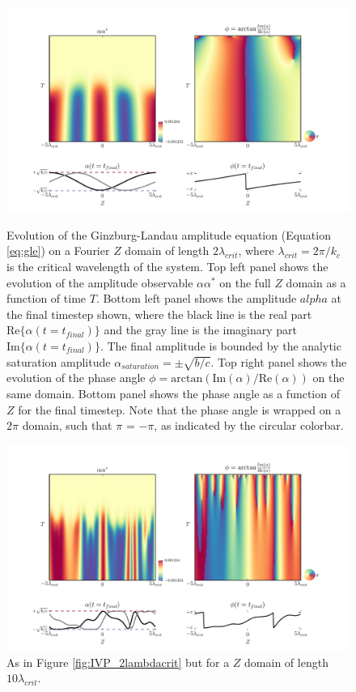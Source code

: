 \documentclass{emulateapj}
\begin{document}
\begin{figure}[h!]
\centering
\includegraphics[width=\textwidth]{IVP_plot_thingap_AA_phase_2lambdacrit_2.pdf}
\caption{Evolution of the Ginzburg-Landau amplitude equation (Equation \ref{eq:gle}) on a Fourier $Z$ domain of length $2 \lambda_{crit}$, where $\lambda_{crit} = 2\pi/k_c$ is the critical wavelength of the system. Top left panel shows the evolution of the amplitude observable $\alpha \alpha^*$ on the full $Z$ domain as a function of time $T$. Bottom left panel shows the amplitude $alpha$ at the final timestep shown, where the black line is the real part $\mathrm{Re}\{\alpha(t = t_{final})\}$ and the gray line is the imaginary part $\mathrm{Im}\{\alpha(t = t_{final})\}$. The final amplitude is bounded by the analytic saturation amplitude $\alpha_{saturation} = \pm \sqrt{b/c}$. Top right panel shows the evolution of the phase angle $\phi = \mathrm{arctan} (\mathrm{Im}(\alpha)/\mathrm{Re}(\alpha))$ on the same domain. Bottom panel shows the phase angle as a function of $Z$ for the final timestep. Note that the phase angle is wrapped on a $2\pi$ domain, such that $\pi$ = $-\pi$, as indicated by the circular colorbar.}\label{fig:IVP_2lambdacrit}

\centering
\includegraphics[width=\textwidth]{IVP_plot_thingap_AA_phase_2lambdacrit_10.pdf}
\caption{As in Figure \ref{fig:IVP_2lambdacrit} but for a $Z$ domain of length $10 \lambda_{crit}$.}\label{fig:IVP_10lambdacrit}
\end{figure}
\end{document}
